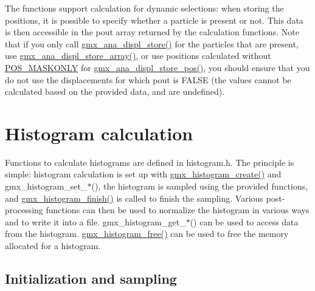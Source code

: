 \-The functions support calculation for dynamic selections\-: when storing the positions, it is possible to specify whether a particle is present or not. \-This data is then accessible in the {\ttfamily pout} array returned by the calculation functions. \-Note that if you only call \hyperlink{include_2displacement_8h_a1249df9ac34685bd9609e1944bccb14a}{gmx\-\_\-ana\-\_\-displ\-\_\-store()} for the particles that are present, use \hyperlink{include_2displacement_8h_a23227f37b703ca5d00cdaa2af678e728}{gmx\-\_\-ana\-\_\-displ\-\_\-store\-\_\-array()}, or use positions calculated without \hyperlink{share_2template_2gromacs_2poscalc_8h_a3586daeaab8b4ff970ae759b3677e7fd}{\-P\-O\-S\-\_\-\-M\-A\-S\-K\-O\-N\-L\-Y} for \hyperlink{include_2displacement_8h_ab79079085cbe4605fc2c5ea9754a91e5}{gmx\-\_\-ana\-\_\-displ\-\_\-store\-\_\-pos()}, you should ensure that you do not use the displacements for which {\ttfamily pout} is \-F\-A\-L\-S\-E (the values cannot be calculated based on the provided data, and are undefined). \hypertarget{histograms}{}\section{\-Histogram calculation}\label{histograms}
\-Functions to calculate histograms are defined in histogram.\-h. \-The principle is simple\-: histogram calculation is set up with \hyperlink{include_2histogram_8h_ab40d6fd1d54b3204f5daf564bf1d8dc3}{gmx\-\_\-histogram\-\_\-create()} and gmx\-\_\-histogram\-\_\-set\-\_\-$\ast$(), the histogram is sampled using the provided functions, and \hyperlink{include_2histogram_8h_a914cda7c09870610bcb3a83ac52cc709}{gmx\-\_\-histogram\-\_\-finish()} is called to finish the sampling. \-Various post-\/processing functions can then be used to normalize the histogram in various ways and to write it into a file. gmx\-\_\-histogram\-\_\-get\-\_\-$\ast$() can be used to access data from the histogram. \hyperlink{include_2histogram_8h_a705814e555fa1ccb2a297903bc47a0f3}{gmx\-\_\-histogram\-\_\-free()} can be used to free the memory allocated for a histogram.\hypertarget{histograms_histogram_sampling}{}\subsection{\-Initialization and sampling}\label{histograms_histogram_sampling}
